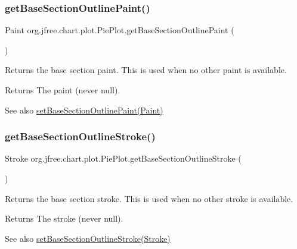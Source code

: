 \subsubsection{\texorpdfstring{get\+Base\+Section\+Outline\+Paint()}{getBaseSectionOutlinePaint()}}
{\footnotesize\ttfamily Paint org.\+jfree.\+chart.\+plot.\+Pie\+Plot.\+get\+Base\+Section\+Outline\+Paint (\begin{DoxyParamCaption}{ }\end{DoxyParamCaption})}

Returns the base section paint. This is used when no other paint is available.

\begin{DoxyReturn}{Returns}
The paint (never {\ttfamily null}).
\end{DoxyReturn}
\begin{DoxySeeAlso}{See also}
\mbox{\hyperlink{classorg_1_1jfree_1_1chart_1_1plot_1_1_pie_plot_ad5603a00bd3987c1735ae3c537453424}{set\+Base\+Section\+Outline\+Paint(\+Paint)}} 
\end{DoxySeeAlso}
\mbox{\label{classorg_1_1jfree_1_1chart_1_1plot_1_1_pie_plot_a30e131b03d74d18e60d06e69f4219df0}} 
\subsubsection{\texorpdfstring{get\+Base\+Section\+Outline\+Stroke()}{getBaseSectionOutlineStroke()}}
{\footnotesize\ttfamily Stroke org.\+jfree.\+chart.\+plot.\+Pie\+Plot.\+get\+Base\+Section\+Outline\+Stroke (\begin{DoxyParamCaption}{ }\end{DoxyParamCaption})}

Returns the base section stroke. This is used when no other stroke is available.

\begin{DoxyReturn}{Returns}
The stroke (never {\ttfamily null}).
\end{DoxyReturn}
\begin{DoxySeeAlso}{See also}
\mbox{\hyperlink{classorg_1_1jfree_1_1chart_1_1plot_1_1_pie_plot_a79ef0ad7ef5443afe7f8834c07f10839}{set\+Base\+Section\+Outline\+Stroke(\+Stroke)}} 
\end{DoxySeeAlso}
\mbox{\label{classorg_1_1jfree_1_1chart_1_1plot_1_1_pie_plot_a3f62bcd5bca8122fa099f9607f75d93a}} 
